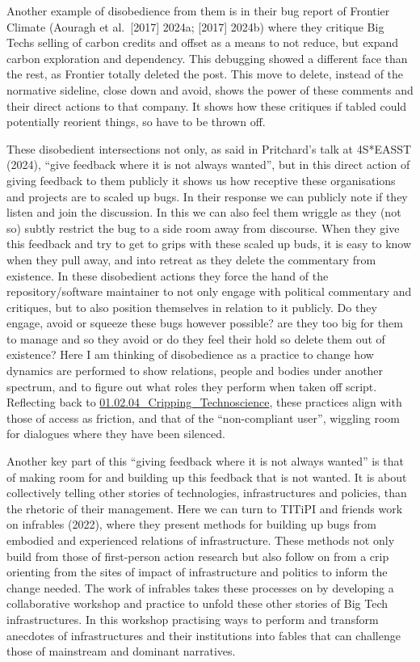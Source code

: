 Another example of disobedience from them is in their bug report of
Frontier Climate (Aouragh et al.~{[}2017{]} 2024a; {[}2017{]} 2024b)
where they critique Big Techs selling of carbon credits and offset as a
means to not reduce, but expand carbon exploration and dependency. This
debugging showed a different face than the rest, as Frontier totally
deleted the post. This move to delete, instead of the normative
sideline, close down and avoid, shows the power of these comments and
their direct actions to that company. It shows how these critiques if
tabled could potentially reorient things, so have to be thrown off.

These disobedient intersections not only, as said in Pritchard's talk at
4S*EASST (2024), ``give feedback where it is not always wanted'', but in
this direct action of giving feedback to them publicly it shows us how
receptive these organisations and projects are to scaled up bugs. In
their response we can publicly note if they listen and join the
discussion. In this we can also feel them wriggle as they (not so)
subtly restrict the bug to a side room away from discourse. When they
give this feedback and try to get to grips with these scaled up buds, it
is easy to know when they pull away, and into retreat as they delete the
commentary from existence. In these disobedient actions they force the
hand of the repository/software maintainer to not only engage with
political commentary and critiques, but to also position themselves in
relation to it publicly. Do they engage, avoid or squeeze these bugs
however possible? are they too big for them to manage and so they avoid
or do they feel their hold so delete them out of existence? Here I am
thinking of disobedience as a practice to change how dynamics are
performed to show relations, people and bodies under another spectrum,
and to figure out what roles they perform when taken off script.
Reflecting back to
\href{../../01_Disability_justice_and_life_affirmation_flipping_the_table/sections/01.02.04_Cripping_Technoscience.md}{01.02.04\_Cripping\_Technoscience},
these practices align with those of access as friction, and that of the
``non-compliant user'', wiggling room for dialogues where they have been
silenced.

Another key part of this ``giving feedback where it is not always
wanted'' is that of making room for and building up this feedback that
is not wanted. It is about collectively telling other stories of
technologies, infrastructures and policies, than the rhetoric of their
management. Here we can turn to TITiPI and friends work on infrables
(2022), where they present methods for building up bugs from embodied
and experienced relations of infrastructure. These methods not only
build from those of first-person action research but also follow on from
a crip orienting from the sites of impact of infrastructure and politics
to inform the change needed. The work of infrables takes these processes
on by developing a collaborative workshop and practice to unfold these
other stories of Big Tech infrastructures. In this workshop practising
ways to perform and transform anecdotes of infrastructures and their
institutions into fables that can challenge those of mainstream and
dominant narratives.

